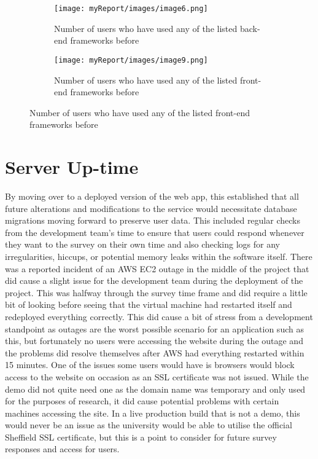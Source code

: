 \pagebreak
\begin{figure}[ht]
  \begin{subfigure}{\linewidth}
    \centering
    \texttt{[image: myReport/images/image6.png]}
    \caption{Number of users who have used any of the listed back-end frameworks before}
    \label{fig:backend_frameworks}
  \end{subfigure}
  
  \begin{subfigure}{\linewidth}
    \centering
    \texttt{[image: myReport/images/image9.png]}
    \caption{Number of users who have used any of the listed front-end frameworks before}
    \label{fig:frontend_frameworks}
  \end{subfigure}
\end{figure}

\section{Server Up-time}

By moving over to a deployed version of the web app, this established that all future alterations and modifications to the service would necessitate database migrations moving forward to preserve user data. This included regular checks from the development team’s time to ensure that users could respond whenever they want to the survey on their own time and also checking logs for any irregularities, hiccups, or potential memory leaks within the software itself.
\newline
\newline
There was a reported incident of an AWS EC2 outage in the middle of the project that did cause a slight issue for the development team during the deployment of the project. This was halfway through the survey time frame and did require a little bit of looking before seeing that the virtual machine had restarted itself and redeployed everything correctly. This did cause a bit of stress from a development standpoint as outages are the worst possible scenario for an application such as this, but fortunately no users were accessing the website during the outage and the problems did resolve themselves after AWS had everything restarted within 15 minutes.
\newline
\newline
One of the issues some users would have is browsers would block access to the website on occasion as an SSL certificate was not issued. While the demo did not quite need one as the domain name was temporary and only used for the purposes of research, it did cause potential problems with certain machines accessing the site. In a live production build that is not a demo, this would never be an issue as the university would be able to utilise the official Sheffield SSL certificate, but this is a point to consider for future survey responses and access for users.